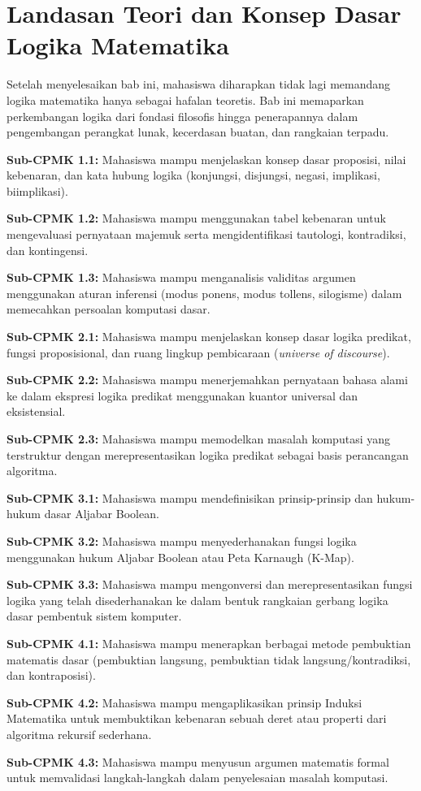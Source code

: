 \documentclass[../main]{subfiles}
\begin{document}
\chapter{Landasan Teori dan Konsep Dasar Logika Matematika}

Setelah menyelesaikan bab ini, mahasiswa diharapkan tidak lagi memandang logika matematika hanya sebagai hafalan teoretis. Bab ini memaparkan perkembangan logika dari fondasi filosofis hingga penerapannya dalam pengembangan perangkat lunak, kecerdasan buatan, dan rangkaian terpadu.

\begin{subcpmk}
  \item \textbf{Sub-CPMK 1.1:} Mahasiswa mampu menjelaskan konsep dasar proposisi, nilai kebenaran, dan kata hubung logika (konjungsi, disjungsi, negasi, implikasi, biimplikasi).
  \item \textbf{Sub-CPMK 1.2:} Mahasiswa mampu menggunakan tabel kebenaran untuk mengevaluasi pernyataan majemuk serta mengidentifikasi tautologi, kontradiksi, dan kontingensi.
  \item \textbf{Sub-CPMK 1.3:} Mahasiswa mampu menganalisis validitas argumen menggunakan aturan inferensi (modus ponens, modus tollens, silogisme) dalam memecahkan persoalan komputasi dasar.
  \item \textbf{Sub-CPMK 2.1:} Mahasiswa mampu menjelaskan konsep dasar logika predikat, fungsi proposisional, dan ruang lingkup pembicaraan (\textit{universe of discourse}).
  \item \textbf{Sub-CPMK 2.2:} Mahasiswa mampu menerjemahkan pernyataan bahasa alami ke dalam ekspresi logika predikat menggunakan kuantor universal dan eksistensial.
  \item \textbf{Sub-CPMK 2.3:} Mahasiswa mampu memodelkan masalah komputasi yang terstruktur dengan merepresentasikan logika predikat sebagai basis perancangan algoritma.
  \item \textbf{Sub-CPMK 3.1:} Mahasiswa mampu mendefinisikan prinsip-prinsip dan hukum-hukum dasar Aljabar Boolean.
  \item \textbf{Sub-CPMK 3.2:} Mahasiswa mampu menyederhanakan fungsi logika menggunakan hukum Aljabar Boolean atau Peta Karnaugh (K-Map).
  \item \textbf{Sub-CPMK 3.3:} Mahasiswa mampu mengonversi dan merepresentasikan fungsi logika yang telah disederhanakan ke dalam bentuk rangkaian gerbang logika dasar pembentuk sistem komputer.
  \item \textbf{Sub-CPMK 4.1:} Mahasiswa mampu menerapkan berbagai metode pembuktian matematis dasar (pembuktian langsung, pembuktian tidak langsung/kontradiksi, dan kontraposisi).
  \item \textbf{Sub-CPMK 4.2:} Mahasiswa mampu mengaplikasikan prinsip Induksi Matematika untuk membuktikan kebenaran sebuah deret atau properti dari algoritma rekursif sederhana.
  \item \textbf{Sub-CPMK 4.3:} Mahasiswa mampu menyusun argumen matematis formal untuk memvalidasi langkah-langkah dalam penyelesaian masalah komputasi.
\end{subcpmk}
\end{document}
